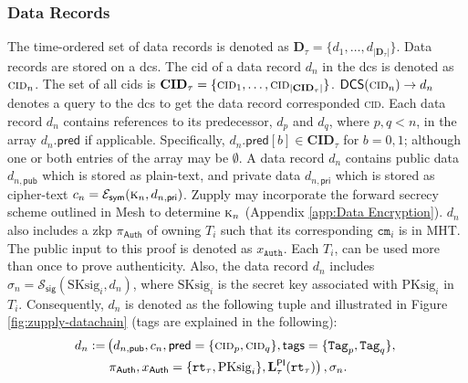 \subsubsection{Data Records}
The time-ordered set of data records is denoted as $\mathbf{D}_\tau = \{d_1, \dots, d_{|\mathbf{D}_\tau|}\}$. Data records are stored on a \gls{dcs}. 
The \gls{cid} of a data record $d_n$ in the \gls{dcs} is denoted as $\textsc{cid}_n$.
The set of all \gls{cid}s is $\mathbf{CID}_\tau = \{\textsc{cid}_1, \dots, \textsc{cid}_{|\mathbf{CID}_\tau|}\}$. 
$\mathsf{DCS}(\textsc{cid}_n) \rightarrow d_n$ denotes a query to the \gls{dcs} to get the data record corresponded  \textsc{cid}.
Each data record $d_n$ contains references to its predecessor, $d_p$ and $d_q$, where $p,q < n$, in the array $d_n.\mathsf{pred}$ if applicable. Specifically, $d_n.\mathsf{pred}[b] \in \mathbf{CID}_\tau$ for ${b = 0, 1}$; although one or both entries of the array may be $\emptyset$.
A data record $d_n$ contains public data $d_{n, \mathsf{pub}}$ which is stored as plain-text, and private data $d_{n, \mathsf{pri}}$ which is stored as cipher-text $c_n = \mathcal{E}_\mathsf{sym}(\textsc{k}_n, d_{n, \mathsf{pri}})$. Zupply may incorporate the forward secrecy scheme outlined in Mesh \cite{altawy2019mesh} to determine $\textsc{k}_n$ (Appendix \ref{app:Data Encryption}). $d_n$ also includes a \gls{zkp} $\pi_\textsf{Auth}$ of owning $T_i$ such that its corresponding $\texttt{cm}_i$ is in \textsf{MHT}.  The public input to this proof is denoted as $x_\texttt{Auth}$. Each $T_i$, can be used more than once to prove authenticity.
Also, the data record $d_n$ includes $\sigma_n = \mathcal{S}_\mathsf{sig}(\text{SKsig}_i, d_n)$, where $\text{SKsig}_i$ is the secret key associated with $\text{PKsig}_{i}$ in $T_i$. Consequently, $d_n$ is denoted as the following tuple and illustrated in Figure \ref{fig:zupply-datachain} (\textsf{tags} are explained in the following):
\begin{align*}
    d_n  := & \left( d_{n, \mathsf{pub}}, c_n, \mathsf{pred}=\{\textsc{cid}_p, \textsc{cid}_q\}, \mathsf{tags}=\{\texttt{Tag}_p, \texttt{Tag}_q\}, \right. \\ 
    & \left. \pi_\textsf{Auth}, x_\textsf{Auth}=\{\texttt{rt}_\tau, \text{PKsig}_{i}\}, \mathbf{L}_\tau^\mathsf{PI}(\texttt{rt}_\tau) \right), \sigma_n.
\end{align*}

